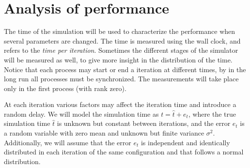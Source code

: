\chapter{Analysis of performance}


The time of the simulation will be used to characterize the performance when 
several parameters are changed. The time is measured using the wall clock, and 
refers to the \textit{time per iteration}. Sometimes the different stages of the 
simulator will be measured as well, to give more insight in the distribution of 
the time. Notice that each process may start or end a iteration at different 
times, by in the long run all processes must be synchronized. The measurements 
will take place only in the first process (with rank zero).

At each iteration various factors may affect the iteration time and introduce a 
random delay. We will model the simulation time as $t = \hat t + e_t$, where the 
true simulation time $\hat t$ is unknown but constant between iterations, and 
the error $e_t$ is a random variable with zero mean and unknown but finite 
variance $\sigma^2$.  Additionally, we will assume that the error $e_t$ is 
independent and identically distributed in each iteration of the same 
configuration and that follows a normal distribution.

